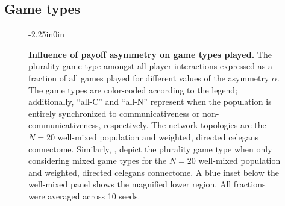 \documentclass[10pt,letterpaper]{article}
\begin{document}
\subsection{Game types}
\begin{figure}
\begin{adjustwidth}{-2.25in}{0in}
  \centering
  \begin{subcaptiongroup}
      {\label{fig:game-type_celegans-full-only-mixed-games}\captiontext*{}}{%
      {\label{fig:game-type_well-mixed-only-mixed-games}\captiontext*{}}{%
      {\label{fig:game-type_celegans-full}\captiontext*{}}{%
      {\label{fig:game-type_well-mixed}\captiontext*{}}{%
    {}%
  }}}}
  \end{subcaptiongroup}
  \caption{
    \textbf{
      Influence of payoff asymmetry on game types played.
    }
    The plurality game type amongst all player interactions
    expressed as a fraction of all games played
    for different values of the asymmetry $\alpha$.
    The game types are color-coded according to the legend;
    additionally, ``all-C'' and ``all-N'' represent when the population
    is entirely synchronized to communicativeness or non-communicativeness, respectively.
    The network topologies are the
    $N=20$ well-mixed population
    and
    weighted, directed \gls{celegans} connectome.
    Similarly,
    ,
    depict the plurality game type when only considering mixed game types
    for the
    $N=20$ well-mixed population
    and
    weighted, directed \gls{celegans} connectome.
    A blue inset below the
    well-mixed panel shows the magnified lower region.
		All fractions were averaged across 10 seeds.
  }\label{fig:game-type}
\end{adjustwidth}
\end{figure}
\end{document}

